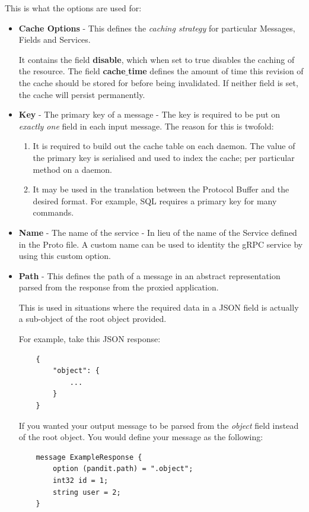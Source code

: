 \documentclass[a4paper,12pt]{report}
\begin{document}
This is what the options are used for:
\begin{itemize}
    \item \textbf{Cache Options} - This defines the \textit{caching strategy} for particular Messages, Fields and Services. 
    
    It contains the field \textbf{disable}, which when set to true disables the caching of the resource. The field \textbf{cache$\_$time} defines the amount of time this revision of the cache should be stored for before being invalidated. If neither field is set, the cache will persist permanently.
    
    \item \textbf{Key} - The primary key of a message - The key is required to be put on \textit{exactly one} field in each input message. The reason for this is twofold:
    \begin{enumerate}
        \item It is required to build out the cache table on each daemon. The value of the primary key is serialised and used to index the cache; per particular method on a daemon.
        \item It may be used in the translation between the Protocol Buffer and the desired format. For example, SQL requires a primary key for many commands.
    \end{enumerate}
    
    \item \textbf{Name} - The name of the service - In lieu of the name of the Service defined in the Proto file. A custom name can be used to identity the gRPC service by using this custom option.
    \item \textbf{Path} - This defines the path of a message in an abstract representation parsed from the response from the proxied application.
    
    This is used in situations where the required data in a JSON field is actually a sub-object of the root object provided.
    
    For example, take this JSON response:
    \begin{lstlisting}
    {
        "object": {
            ...
        }
    }
    \end{lstlisting}
    If you wanted your output message to be parsed from the \textit{object} field instead of the root object. You would define your message as the following:
    \begin{lstlisting}
    message ExampleResponse {
        option (pandit.path) = ".object";
        int32 id = 1;
        string user = 2;
    }
    \end{lstlisting}
    

\end{itemize}
\end{document}
